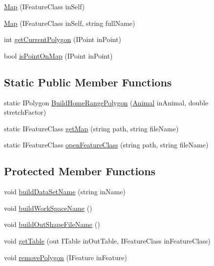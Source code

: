\begin{DoxyCompactItemize}
\item 
\hyperlink{class_p_a_z___dispersal_1_1_map_ad926f66e8aa9d461f13f4547d85a79b5}{Map} (I\-Feature\-Class in\-Self)
\item 
\hyperlink{class_p_a_z___dispersal_1_1_map_a1d24276df37b8559cab14826956f1610}{Map} (I\-Feature\-Class in\-Self, string full\-Name)
\item 
int \hyperlink{class_p_a_z___dispersal_1_1_map_ad27a736ea159dea9bc52bcbce7bde61b}{get\-Current\-Polygon} (I\-Point in\-Point)
\item 
bool \hyperlink{class_p_a_z___dispersal_1_1_map_ac959171b591d29c818f94f40b77f937c}{is\-Point\-On\-Map} (I\-Point in\-Point)
\end{DoxyCompactItemize}
\subsection*{Static Public Member Functions}
\begin{DoxyCompactItemize}
\item 
static I\-Polygon \hyperlink{class_p_a_z___dispersal_1_1_map_a24794c0940c78aa6efafdd570c20aba5}{Build\-Home\-Range\-Polygon} (\hyperlink{class_p_a_z___dispersal_1_1_animal}{Animal} in\-Animal, double stretch\-Factor)
\item 
static I\-Feature\-Class \hyperlink{class_p_a_z___dispersal_1_1_map_a187452f66540d4031aae5749dbb937a9}{get\-Map} (string path, string file\-Name)
\item 
static I\-Feature\-Class \hyperlink{class_p_a_z___dispersal_1_1_map_a4a8519d8a5491c3304ef99068c687f3b}{open\-Feature\-Class} (string path, string file\-Name)
\end{DoxyCompactItemize}
\subsection*{Protected Member Functions}
\begin{DoxyCompactItemize}
\item 
void \hyperlink{class_p_a_z___dispersal_1_1_map_a9807827cc9350f7ee155b14321ece62d}{build\-Data\-Set\-Name} (string in\-Name)
\item 
void \hyperlink{class_p_a_z___dispersal_1_1_map_ad6f185614313c82bea4f7b4b5058ddeb}{build\-Work\-Space\-Name} ()
\item 
void \hyperlink{class_p_a_z___dispersal_1_1_map_aaa585e001713380cc0b819bc2ff495db}{build\-Out\-Shape\-File\-Name} ()
\item 
void \hyperlink{class_p_a_z___dispersal_1_1_map_afd20b8c7eddacaed5ba3c58ebad15660}{get\-Table} (out I\-Table in\-Out\-Table, I\-Feature\-Class in\-Feature\-Class)
\item 
void \hyperlink{class_p_a_z___dispersal_1_1_map_a817b5df224b2044c5fac0d2c2dce7f0d}{remove\-Polygon} (I\-Feature in\-Feature)
\end{DoxyCompactItemize}
